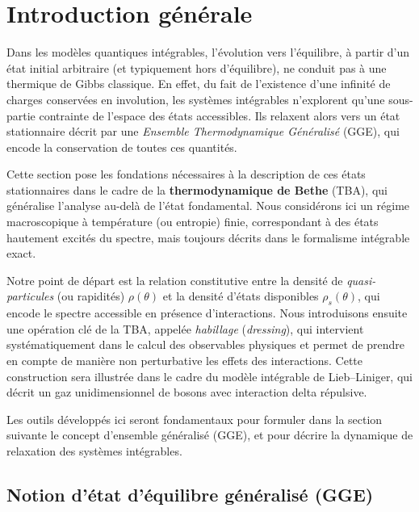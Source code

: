 \section{Introduction générale}

Dans les modèles quantiques intégrables, l’évolution vers l’équilibre, à partir d’un état initial arbitraire (et typiquement hors d’équilibre), ne conduit pas à une thermique de Gibbs classique.  
En effet, du fait de l’existence d’une infinité de charges conservées en involution, les systèmes intégrables n’explorent qu’une sous-partie contrainte de l’espace des états accessibles.  
Ils relaxent alors vers un état stationnaire décrit par une \emph{Ensemble Thermodynamique Généralisé} (GGE), qui encode la conservation de toutes ces quantités.

Cette section pose les fondations nécessaires à la description de ces états stationnaires dans le cadre de la \textbf{thermodynamique de Bethe} (TBA), qui généralise l’analyse au-delà de l’état fondamental.  
Nous considérons ici un régime macroscopique à température (ou entropie) finie, correspondant à des états hautement excités du spectre, mais toujours décrits dans le formalisme intégrable exact.

Notre point de départ est la relation constitutive entre la densité de \emph{quasi-particules} (ou rapidités) $\rho(\theta)$ et la densité d’états disponibles $\rho_s(\theta)$, qui encode le spectre accessible en présence d’interactions.  
Nous introduisons ensuite une opération clé de la TBA, appelée \emph{habillage} (\emph{dressing}), qui intervient systématiquement dans le calcul des observables physiques et permet de prendre en compte de manière non perturbative les effets des interactions.  
Cette construction sera illustrée dans le cadre du modèle intégrable de Lieb–Liniger, qui décrit un gaz unidimensionnel de bosons avec interaction delta répulsive.

Les outils développés ici seront fondamentaux pour formuler dans la section suivante le concept d’ensemble généralisé (GGE), et pour décrire la dynamique de relaxation des systèmes intégrables.



\subsection{Notion d’état d’équilibre généralisé (GGE)}

